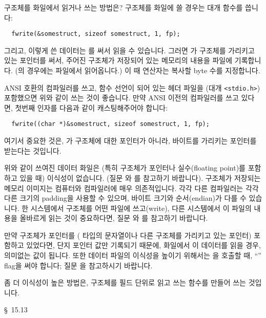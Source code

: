 \begin{faq}
	구조체를 화일에서 읽거나 쓰는 방법은?
\A
	구조체를 화일에 쓸 경우는 대개  함수를 씁니다:

\begin{verbatim}
  fwrite(&somestruct, sizeof somestruct, 1, fp);
\end{verbatim}

\noindent
	그리고, 이렇게 쓴 데이터는 를 써서 읽을 수 있습니다.
        그러면 가 구조체를 가리키고 있는 포인터를 써서,
        주어진 구조체가 저장되어 있는 메모리의 내용을 파일에 기록합니다.
        (의 경우에는 파일에서 읽어옵니다.) 이 때  연산자는
        복사할 byte 수를 지정합니다.
        
        ANSI 호환의 컴파일러를 쓰고, 함수 선언이 되어 있는 헤더 파일을
        (대개 \verb+<stdio.h>+) 포함했으면 위와 같이 쓰는 것이 좋습니다.
        만약 ANSI 이전의 컴파일러를 쓰고 있다면, 첫번째 인자를 다음과 같이
        캐스팅해주어야 합니다:
\begin{verbatim}
  fwrite((char *)&somestruct, sizeof somestruct, 1, fp);
\end{verbatim}
        여기서 중요한 것은, 가 구조체에 대한 포인터가 아니라,
        바이트를 가리키는 포인터를 받는다는 것입니다.
        
	위와 같이 쓰여진 데이터 화일은 (특히 구조체가 포인터나 실수(floating point)를
        포함하고 있을 때) 이식성이 없습니다.  (질문 와 를
	참고하기 바랍니다). 구조체가 저장되는 메모리 이미지는 컴퓨터와 컴파일러에 매우
        의존적입니다. 각각 다른 컴파일러는 각각 다른 크기의 padding을 사용할 수 있으며,
        바이트 크기와 순서(endian)가 다를 수 있습니다.
        한 시스템에서 구조체를 어떤 파일에 쓰고(write), 다른 시스템에서 이 파일의 내용을
        올바르게 읽는 것이 중요하다면, 질문 와 를 참고하기 바랍니다.
                
        만약 구조체가 포인터를 ( 타입의 문자열이나 다른 구조체를 가리키고 있는
        포인터) 포함하고 있었다면, 단지
	포인터 값만 기록되기 때문에, 화일에서 이 데이터를 읽을 경우, 의미없는
	값이 됩니다.  또한 데이터 파일의 이식성을 높이기 위해서는
	을 호출할 때, ``'' flag을 써야 합니다;
	질문 을 참고하시기 바랍니다.

	좀 더 이식성이 높은 방법은, 구조체를 필드 단위로 읽고 쓰는 함수를
	만들어 쓰는 것입니다.

\R
        \cite{hs} \S\ 15.13 
\end{faq}

